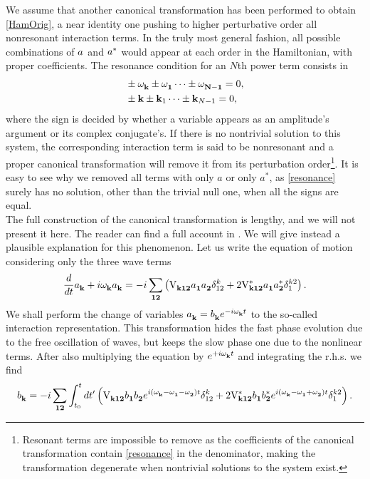 We assume that another canonical transformation has been performed to obtain \eqref{HamOrig}, a near identity one
pushing to higher perturbative order all nonresonant interaction terms. In the truly most general fashion, all possible combinations of $a^{}$ and $a^{*}$ 
would appear at each order in the Hamiltonian, with proper coefficients. The resonance condition for an $N$th power term consists in
\begin{align}
    &\pm \omega^{}_{\mathbf{k}} \pm \omega^{}_\mathbf{1} \dots \pm \omega^{}_\mathbf{N-1} = 0, \label{resonance}\\
    &\pm \mathbf{k} \pm \mathbf{k}_1 \dots \pm \mathbf{k}_{N-1} = 0,
\end{align}
where the sign is decided by whether a variable appears as an amplitude's argument or its complex conjugate's. If there is no nontrivial solution to this system, the corresponding 
interaction term is said to be nonresonant and a proper canonical transformation will remove it from its perturbation order\footnote{
    Resonant terms are impossible to remove as the coefficients of the canonical transformation contain \eqref{resonance} in the denominator,
making the transformation degenerate when nontrivial solutions to the system exist.
}. It is easy to see why we removed all terms
with only $a$ or only $a^*$, as \eqref{resonance} surely has no solution, other than the trivial null one, when all the signs are equal.\\
The full construction of the canonical transformation is lengthy, and we will not present it here. The reader can find a full account in \cite{Zakharov}.
We will give instead a plausible explanation for this phenomenon. Let us write the equation of motion considering only the three wave terms
\begin{equation}
    \frac{d}{dt} a_\mathbf{k}^{} + i \omega^{}_{\mathbf{k}} a_\mathbf{k}^{} = -i\sum_{\mathbf{12}} \left( \mathrm{V}_{\mathbf{k12}}^{} a_\mathbf{1}^{} a_\mathbf{2}^{} \delta^{k}_{12} + 2 
    \mathrm{V}^*_\mathbf{k12}a_\mathbf{1}^{} a_\mathbf{2}^{*} \delta^{k2}_{1}  \right).
\end{equation}
We shall perform the change of variables $a_\mathbf{k}^{} = b_\mathbf{k}^{} e^{-i\omega^{}_{\mathbf{k}} t}$ to the so-called interaction representation.
This transformation hides the fast phase evolution due to the free oscillation of waves, but keeps the slow phase 
one due to the nonlinear terms. After also multiplying the equation by $e^{+i\omega^{}_{\mathbf{k}} t}$ and integrating the r.h.s. we find
\begin{equation}
    b_\mathbf{k}^{}= -i\sum_{\mathbf{12}} \int_{t_0}^{t} dt'\left( \mathrm{V}_{\mathbf{k12}}^{} b_\mathbf{1}^{} b_\mathbf{2}^{}e^{i( \omega^{}_{\mathbf{k}}-\omega^{}_\mathbf{1} - \omega^{}_\mathbf{2})t} \delta^{k}_{12} 
    + 2 \mathrm{V}^*_\mathbf{k12}b_\mathbf{1}^{} b_\mathbf{2}^{*}e^{i(\omega^{}_{\mathbf{k}}-\omega^{}_\mathbf{1} + \omega^{}_\mathbf{2})t} \delta^{k2}_{1}  \right).
\end{equation}
